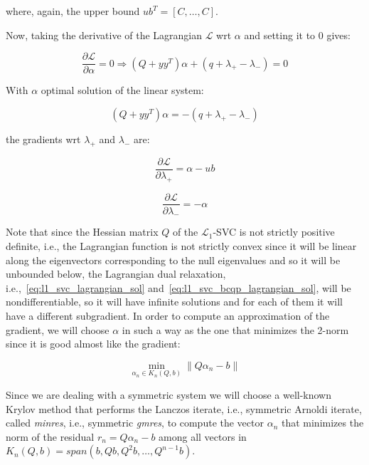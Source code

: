 where, again, the upper bound $ub^T = [C, \dots, C]$.

Now, taking the derivative of the Lagrangian $\mathcal{L}$ wrt $\alpha$ and setting it to 0 gives:

\begin{equation} \label{eq:l1_svc_bcqp_lagrangian_der_a}
	\frac{\partial \mathcal{L}}{\partial \alpha}=0\Rightarrow (Q + yy^T) \alpha + (q + \lambda_+ - \lambda_-) = 0
\end{equation}

With $\alpha$ optimal solution of the linear system:

\begin{equation} \label{eq:l1_svc_bcqp_lagrangian_sol}
    (Q + yy^T) \alpha = - (q + \lambda_+ - \lambda_-)
\end{equation}

the gradients wrt $\lambda_+$ and $\lambda_-$ are:

\begin{equation} \label{eq:l1_svc_bcqp_lagrangian_der_lp}
	\frac{\partial \mathcal{L}}{\partial \lambda_+}=\alpha - ub
\end{equation}

\begin{equation} \label{eq:l1_svc_bcqp_lagrangian_der_lm}
    \frac{\partial \mathcal{L}}{\partial \lambda_-}=-\alpha
\end{equation}

\bigskip

Note that since the Hessian matrix $Q$ of the $\mathcal{L}_1$-SVC is not strictly positive definite, i.e., the Lagrangian function is not strictly convex since it will be linear along the eigenvectors corresponding to the null eigenvalues and so it will be unbounded below, the Lagrangian dual relaxation, i.e.,~\ref{eq:l1_svc_lagrangian_sol} and~\ref{eq:l1_svc_bcqp_lagrangian_sol}, will be nondifferentiable, so it will have infinite solutions and for each of them it will have a different subgradient. In order to compute an approximation of the gradient, we will choose $\alpha$ in such a way as the one that minimizes the 2-norm since it is good almost like the gradient:

\begin{equation} \label{eq:svc_lagrangian_krylov_sol}
	\min_{\alpha_n \in K_n(Q, b)} \| Q \alpha_n - b \|
\end{equation}

Since we are dealing with a symmetric system we will choose a well-known Krylov method that performs the Lanczos iterate, i.e., symmetric Arnoldi iterate, called \emph{minres}, i.e., symmetric \emph{gmres}, to compute the vector $\alpha_n$ that minimizes the norm of the residual $r_n = Q \alpha_n - b$ among all vectors in $K_n(Q, b) = span(b, Qb, Q^2b, \dots, Q^{n-1}b)$.

